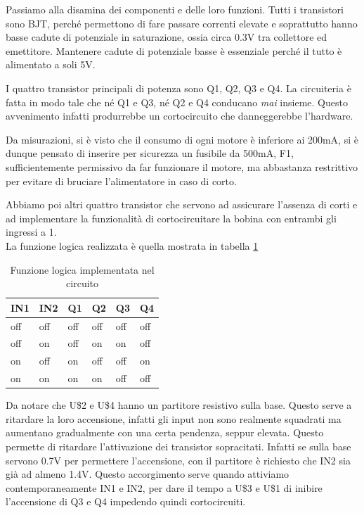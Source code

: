 \documentclass[12pt]{article}
\begin{document}
Passiamo alla disamina dei componenti e delle loro funzioni.
Tutti i transistori sono BJT, perché permettono di fare passare correnti elevate e soprattutto hanno basse cadute di potenziale in saturazione, ossia circa 0.3V tra collettore ed emettitore. Mantenere cadute di potenziale basse è essenziale perché il tutto è alimentato a soli 5V.

I quattro transistor principali di potenza sono Q1, Q2, Q3 e Q4. La circuiteria è fatta in modo tale che né Q1 e Q3, né Q2 e Q4 conducano \emph{mai} insieme. Questo avvenimento infatti produrrebbe un cortocircuito che danneggerebbe l'hardware.

Da misurazioni, si è visto che il consumo di ogni motore è inferiore ai 200mA, si è dunque pensato di inserire per sicurezza un fusibile da 500mA, F1, sufficientemente permissivo da far funzionare il motore, ma abbastanza restrittivo per evitare di bruciare l'alimentatore in caso di corto.

Abbiamo poi altri quattro transistor che servono ad assicurare l'assenza di corti e ad implementare la funzionalità di cortocircuitare la bobina con entrambi gli ingressi a 1.\\
La funzione logica realizzata è quella mostrata in tabella \ref{tab:tabFunz}

\begin{table}[h]
\begin{center}


\begin{tabular}{l|l|l|l|l|l}

IN1 & IN2 & Q1 & Q2 & Q3 & Q4 \\
\hline
off & off & off & off & off & off \\
off & on & off & on & on &  off \\
on & off & on & off & off &  on \\
on & on & on & on & off & off


\end{tabular}

\end{center}
\caption{Funzione logica implementata nel circuito}
\label{tab:tabFunz}
\end{table}

Da notare che U\$2 e U\$4 hanno un partitore resistivo sulla base. Questo serve a ritardare la loro accensione, infatti gli input non sono realmente squadrati ma aumentano gradualmente con una certa pendenza, seppur elevata. Questo permette di ritardare l'attivazione dei transistor sopracitati. Infatti se sulla base servono 0.7V per permettere l'accensione, con il partitore è richiesto che IN2 sia già ad almeno 1.4V. Questo accorgimento serve quando attiviamo contemporaneamente IN1 e IN2, per dare il tempo a U\$3 e U\$1 di inibire l'accensione di Q3 e Q4 impedendo quindi cortocircuiti.
\end{document}
